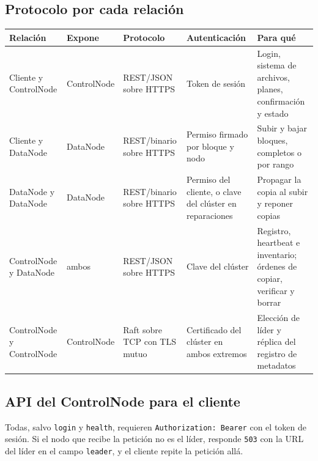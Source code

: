 \documentclass[10pt]{article}
\begin{document}
\subsection{Protocolo por cada relación}

\begin{xltabular}{\linewidth}{@{}L{2.4cm}L{2.0cm}L{2.6cm}L{3.3cm}Y@{}}
\toprule
Relación & Expone & Protocolo & Autenticación & Para qué \\
\midrule\endhead
Cliente y ControlNode & ControlNode & REST/JSON sobre HTTPS & Token de sesión & Login, sistema de archivos, planes, confirmación y estado \\
Cliente y DataNode & DataNode & REST/binario sobre HTTPS & Permiso firmado por bloque y nodo & Subir y bajar bloques, completos o por rango \\
DataNode y DataNode & DataNode & REST/binario sobre HTTPS & Permiso del cliente, o clave del clúster en reparaciones & Propagar la copia al subir y reponer copias \\
ControlNode y DataNode & ambos & REST/JSON sobre HTTPS & Clave del clúster & Registro, heartbeat e inventario; órdenes de copiar, verificar y borrar \\
ControlNode y ControlNode & ControlNode & Raft sobre TCP con TLS mutuo & Certificado del clúster en ambos extremos & Elección de líder y réplica del registro de metadatos \\
\bottomrule
\end{xltabular}

\subsection{API del ControlNode para el cliente}

Todas, salvo \texttt{login} y \texttt{health}, requieren \texttt{Authorization: Bearer} con el token de sesión. Si el nodo que recibe la petición no es el líder, responde \texttt{503} con la URL del líder en el campo \texttt{leader}, y el cliente repite la petición allá.
\end{document}
